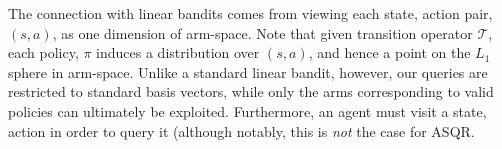 \documentclass{article}
\begin{document}
The connection with linear bandits comes from viewing each state, action pair, $(s,a)$, as one dimension of arm-space.
Note that given transition operator $\mathcal{T}$, each policy, $\pi$ induces a distribution over $(s,a)$, and hence a point on the $L_1$ sphere in arm-space.
Unlike a standard linear bandit, however, our queries are restricted to standard basis vectors, while only the arms corresponding to valid policies can ultimately be exploited.
Furthermore, an agent must visit a state, action in order to query it (although notably, this is \emph{not} the case for ASQR.






%

\end{document}
